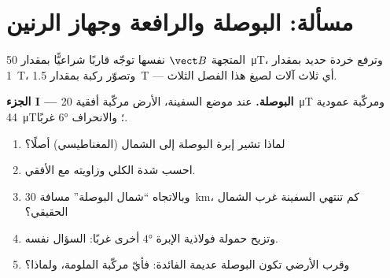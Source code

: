 \section{مسألة: البوصلة والرافعة وجهاز الرنين}

\begin{problem}
\label{pb:g11:magnetic-fields:1}
المتجهة $\vect B$ نفسها توجّه قاربًا شراعيًّا بمقدار \qty{50}{\micro T}،
وترفع خردة حديد بمقدار \qty{1}{T}، وتصوّر ركبة بمقدار \qty{1.5}{T}
--- أي ثلاث آلات لصيغ هذا الفصل الثلاث.

\medskip
\noindent\textbf{الجزء I --- البوصلة.}
عند موضع السفينة،  الأرض مركّبة أفقية
\qty{20}{\micro T} ومركّبة عمودية \qty{44}{\micro T}؛
والانحراف $\ang{6}$ غربًا.
\begin{enumerate}
  \item لماذا تشير إبرة البوصلة إلى الشمال (المغناطيسي) أصلًا؟
  \item احسب شدة  الكلي وزاويته مع الأفقي.
  \item وبالاتجاه ``شمال البوصلة'' مسافة \qty{30}{km}، كم تنتهي السفينة
        غرب  الشمال الحقيقي؟
  \item وتزيح حمولة فولاذية الإبرة $\ang{4}$ أخرى غربًا: السؤال نفسه.
  \item وقرب  الأرضي تكون البوصلة عديمة الفائدة: فأيّ مركّبة
        الملومة، ولماذا؟
\end{enumerate}


\end{problem}
